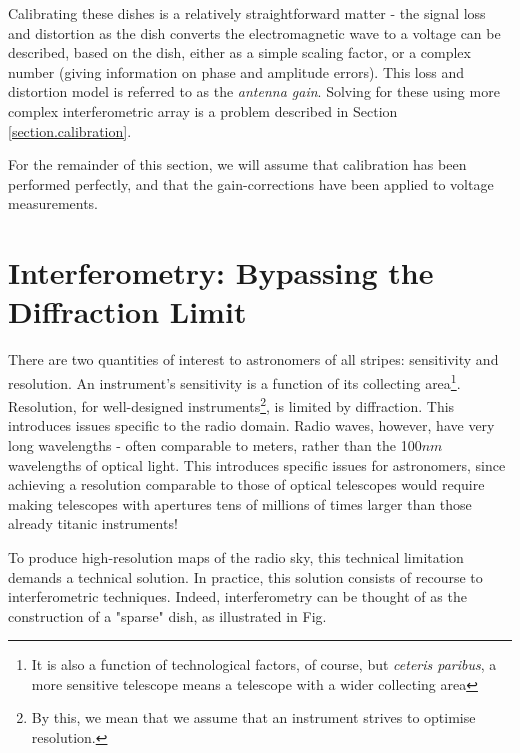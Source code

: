 \pg
Calibrating these dishes is a relatively straightforward matter - the signal loss and distortion as the dish converts the electromagnetic wave to a voltage can be described, based on the dish, either as a simple scaling factor, or a complex number (giving information on phase and amplitude errors). This loss and distortion model is referred to as the \emph{antenna gain}. Solving for these using more complex interferometric array is a problem described in Section \ref{section.calibration}.

\pg
For the remainder of this section, we will assume that calibration has been performed perfectly, and that the gain-corrections have been applied to voltage measurements. 

\section{Interferometry: Bypassing the Diffraction Limit}

\pg
There are two quantities of interest to astronomers of all stripes: sensitivity and resolution. An instrument's sensitivity is a function of its collecting area\footnote{It is also a function of technological factors, of course, but \emph{ceteris paribus}, a more sensitive telescope means a telescope with a wider collecting area}. Resolution, for well-designed instruments\footnote{By this, we mean that we assume that an instrument strives to optimise resolution.}, is limited by diffraction. This introduces issues specific to the radio domain. Radio waves, however, have very long wavelengths - often comparable to meters, rather than the 100$nm$ wavelengths of optical light. This introduces specific issues for astronomers, since achieving a resolution comparable to those of optical telescopes would require making telescopes with apertures tens of millions of times larger than those already titanic instruments!

\pg
To produce high-resolution maps of the radio sky, this technical limitation demands a technical solution. In practice, this solution consists of recourse to interferometric techniques. Indeed, interferometry can be thought of as the construction of a "sparse" dish, as illustrated in Fig.


